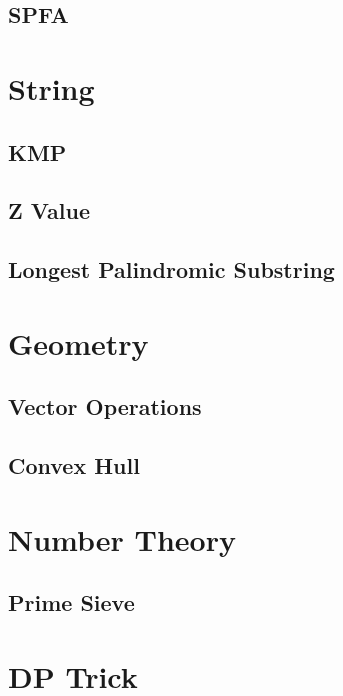 \documentclass[twocolumn]{article}
\begin{document}
\subsection{SPFA}


\section{String}

\subsection{KMP}


\subsection{Z Value}


\subsection{Longest Palindromic Substring}


\section{Geometry}

\subsection{Vector Operations}


\subsection{Convex Hull}


\section{Number Theory}

\subsection{Prime Sieve}


\section{DP Trick}
\end{document}
